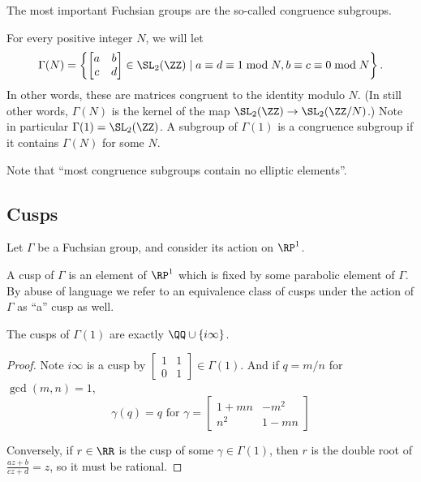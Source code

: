 The most important Fuchsian groups are the so-called congruence subgroups.
\begin{definition}
  For every positive integer $N$, we will let
  \[
    \Gamma(N) =
    \left\{ \begin{bmatrix} a & b \\ c & d \end{bmatrix} \in \SL_2(\ZZ)
    \mid a \equiv d \equiv 1 \bmod N, b \equiv c \equiv 0 \bmod N\right\}.
  \]
  In other words, these are matrices congruent to the identity modulo $N$.
  (In still other words, $\Gamma(N)$ is the kernel
  of the map $\SL_2(\ZZ) \to \SL_2(\ZZ/N)$.)
  Note in particular $\Gamma(1) = \SL_2(\ZZ)$.
  A subgroup of $\Gamma(1)$ is a \alert{congruence subgroup}
  if it contains $\Gamma(N)$ for some $N$.
\end{definition}
Note that ``most congruence subgroups contain no elliptic elements''.

\subsection{Cusps}
Let $\Gamma$ be a Fuchsian group,
and consider its action on $\RP^1$.
\begin{definition}
  A \alert{cusp} of $\Gamma$ is an element of $\RP^1$
  which is fixed by some parabolic element of $\Gamma$.
  By abuse of language we refer to an equivalence class of cusps
  under the action of $\Gamma$ as ``a'' cusp as well.
\end{definition}

\begin{proposition}
  The cusps of $\Gamma(1)$ are exactly $\QQ \cup \{i\infty\}$.
\end{proposition}
\begin{proof}
  Note $i\infty$ is a cusp by
  $\begin{bmatrix} 1 & 1 \\ 0 & 1 \end{bmatrix} \in \Gamma(1)$.
  And if $q = m/n$ for $\gcd(m,n)=1$,
  \[ \gamma(q) = q \text{ for } \gamma =
    \begin{bmatrix} 1+mn & -m^2 \\ n^2 & 1-mn \end{bmatrix} \]

  Conversely, if $r \in \RR$ is the cusp of some $\gamma \in \Gamma(1)$,
  then $r$ is the double root of $\frac{az+b}{cz+d} = z$,
  so it must be rational.
\end{proof}

